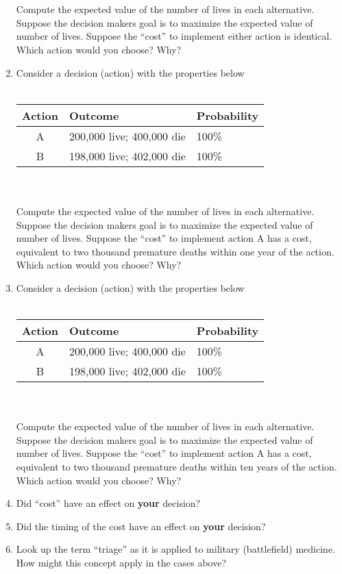 \documentclass[12pt]{article}
\begin{document}
\begin{enumerate}
\begin{tabular}{cll}
\end{tabular}\\~\\
Compute the expected value of the number of lives in each alternative.
Suppose the decision makers goal is to maximize the expected value of number of lives.
Suppose the ``cost'' to implement either action is identical.
Which action would you choose? Why?
\newpage
\item Consider a decision (action) with the properties below \\ ~\\
\begin{tabular}{cll}
Action & Outcome & Probability \\
\hline
\hline
A & 200,000 live; 400,000 die & 100\% \\
B & 198,000 live; 402,000 die & 100\% \\
\end{tabular}\\~\\
Compute the expected value of the number of lives in each alternative.
Suppose the decision makers goal is to maximize the expected value of number of lives.
Suppose the ``cost'' to implement action A has a cost, equivalent to two thousand premature deaths within one year of the action.
Which action would you choose? Why?
\item Consider a decision (action) with the properties below \\ ~\\
\begin{tabular}{cll}
Action & Outcome & Probability \\
\hline
\hline
A & 200,000 live; 400,000 die & 100\% \\
B & 198,000 live; 402,000 die & 100\% \\
\end{tabular}\\~\\
Compute the expected value of the number of lives in each alternative.
Suppose the decision makers goal is to maximize the expected value of number of lives.
Suppose the ``cost'' to implement action A has a cost, equivalent to two thousand premature deaths within ten years of the action.
Which action would you choose? Why?
\item Did ``cost'' have an effect on \textbf{your} decision?   
\item Did the timing of the cost have an effect on \textbf{your} decision?   
\item Look up the term ``triage'' as it is applied to military (battlefield) medicine.  How might this concept apply in the cases above? 


\end{enumerate}
\end{document}
